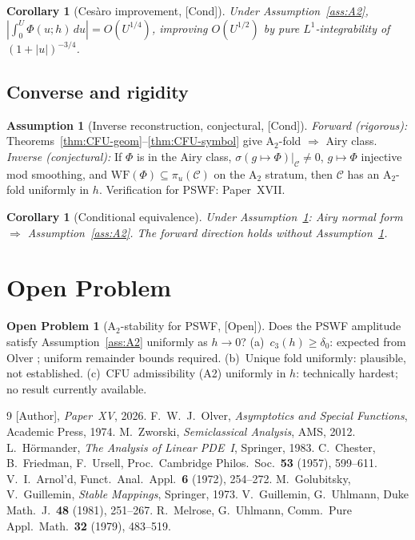 \documentclass[12pt,a4paper]{amsart}
\newtheorem{corollary}[theorem]{Corollary}
\theoremstyle{definition}
\newtheorem{assumption}[theorem]{Assumption}
\newtheorem{problem}[theorem]{Open Problem}
\theoremstyle{remark}
\newcommand{\Cond}{\textup{[Cond]}}
\newcommand{\Open}{\textup{[Open]}}
\begin{document}
\begin{corollary}[Ces\`aro improvement, \Cond]
\label{cor:cesaro}
Under Assumption~\ref{ass:A2},
$|\int_0^U\Phi(u;h)\,du|=O(U^{1/4})$,
improving $O(U^{1/2})$ by pure $L^1$-integrability
of $(1+|u|)^{-3/4}$.
\end{corollary}

\subsection{Converse and rigidity}

\begin{assumption}[Inverse reconstruction,
  conjectural, \Cond]
\label{hyp:rigidity}
\textit{Forward (rigorous):}
Theorems~\ref{thm:CFU-geom}--\ref{thm:CFU-symbol}
give A$_2$-fold $\Rightarrow$ Airy class.
\textit{Inverse (conjectural):}
If $\Phi$ is in the Airy class,
$\sigma(g\mapsto\Phi)|_\mathcal{C}\ne 0$,
$g\mapsto\Phi$ injective mod smoothing,
and $\mathrm{WF}(\Phi)\subseteq\pi_u(\mathcal{C})$
on the A$_2$ stratum,
then $\mathcal{C}$ has an A$_2$-fold uniformly in $h$.
Verification for PSWF: Paper~XVII.
\end{assumption}

\begin{corollary}[Conditional equivalence]
\label{cor:equiv}
Under Assumption~\ref{hyp:rigidity}:
Airy normal form $\Rightarrow$ Assumption~\ref{ass:A2}.
The forward direction holds without
Assumption~\ref{hyp:rigidity}.
\end{corollary}

\section{Open Problem}
\label{sec:open}

\begin{problem}[A$_2$-stability for PSWF, \Open]
\label{prob:PSWF}
Does the PSWF amplitude satisfy
Assumption~\ref{ass:A2} uniformly as $h\to 0$?
(a)~$c_3(h)\ge\delta_0$: expected from Olver \cite{Olver1974};
uniform remainder bounds required.
(b)~Unique fold uniformly: plausible, not established.
(c)~CFU admissibility (A2) uniformly in $h$:
technically hardest; no result currently available.
\end{problem}

\begin{thebibliography}{9}
[Author], \textit{Paper~XV}, 2026.
F.~W.~J.~Olver,
\textit{Asymptotics and Special Functions},
Academic Press, 1974.
M.~Zworski,
\textit{Semiclassical Analysis}, AMS, 2012.
L.~H\"ormander,
\textit{The Analysis of Linear PDE~I},
Springer, 1983.
C.~Chester, B.~Friedman, F.~Ursell,
Proc.\ Cambridge Philos.\ Soc.\
\textbf{53} (1957), 599--611.
V.~I.~Arnol'd,
Funct.\ Anal.\ Appl.\
\textbf{6} (1972), 254--272.
M.~Golubitsky, V.~Guillemin,
\textit{Stable Mappings}, Springer, 1973.
\bibitem{GuillemU1981}
V.~Guillemin, G.~Uhlmann,
Duke Math.\ J.\ \textbf{48} (1981), 251--267.
\bibitem{MelroseU1979}
R.~Melrose, G.~Uhlmann,
Comm.\ Pure Appl.\ Math.\
\textbf{32} (1979), 483--519.
\end{thebibliography}
\end{document}
